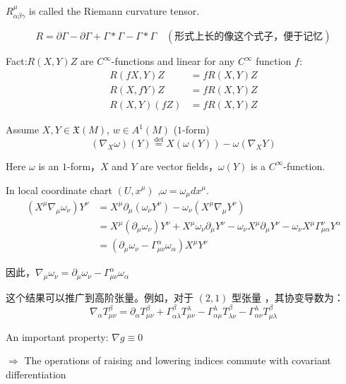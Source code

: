 \( R_{\alpha\beta\gamma}^\mu \) is called the Riemann curvature tensor.

\[
R = \partial \Gamma - \partial \Gamma + \Gamma \ast \Gamma - \Gamma \ast \Gamma \quad (\text{形式上长的像这个式子，便于记忆})
\]



Fact:\( R(X, Y)Z \) are \( C^\infty \)-functions and linear for any \( C^\infty \) function \( f \):
\begin{align*}
R(fX, Y)Z &= f R(X, Y)Z \\
R(X, fY)Z &= f R(X, Y)Z \\
R(X, Y)(fZ) &= f R(X, Y)Z
\end{align*}


Assume  \(X, Y \in \mathfrak{X}(M)\), \(w \in A^1(M)\) ($1$-form)
\[
(\nabla_X \omega)(Y) \overset{\text{def}}{=} X(\omega(Y)) - \omega(\nabla_X Y)
\]


Here $\omega$ is an $1$-form，$X$ and $Y$ are vector fields，$\omega(Y)$ is a $C^\infty$-function.


In local coordinate chart $(U, x^\mu)$ ,\(\omega = \omega_\mu dx^\mu\).
\begin{equation*}
\begin{aligned}
(X^\mu \nabla_\mu \omega_\nu) Y^\nu 
&= X^\mu \partial_\mu (\omega_\nu Y^\nu) - \omega_\nu (X^\mu \nabla_\mu Y^\nu) \\
&= X^\mu (\partial_\mu \omega_\nu) Y^\nu + X^\mu \omega_\nu \partial_\mu Y^\nu - \omega_\nu X^\mu \partial_\mu Y^\nu - \omega_\nu X^\mu \Gamma_{\mu\alpha}^\nu Y^\alpha \\
&= (\partial_\mu \omega_\nu - \Gamma_{\mu\nu}^\alpha \omega_\alpha) X^\mu Y^\nu
\end{aligned}
\end{equation*}

因此，$\nabla_\mu \omega_\nu = \partial_\mu \omega_\nu - \Gamma_{\mu\nu}^\alpha \omega_\alpha$

\begin{remark}
这个结果可以推广到高阶张量。例如，对于 $(2,1)$ 型张量 ，其协变导数为：
\[
\nabla_\alpha T^{\beta}_{\mu\nu} = \partial_\alpha T^{\beta}_{\mu\nu}
+ \Gamma^{\beta}_{\alpha\lambda} T^{\lambda}_{\mu\nu}
- \Gamma_{\alpha\mu}^\lambda T^{\beta}_{\lambda\nu}
- \Gamma_{\alpha\nu}^\lambda T^{\beta}_{\mu\lambda}
\]
\end{remark}

An important property: $\nabla g \equiv 0$

$\Rightarrow$ The operations of raising and lowering indices commute with covariant differentiation

